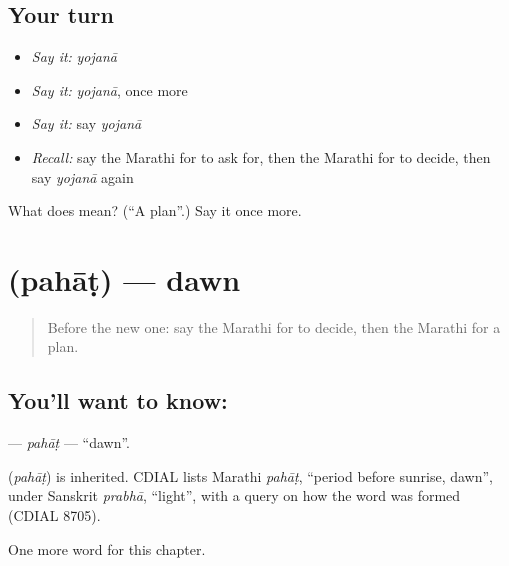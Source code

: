 \subsection*{Your turn}
\begin{itemize}
\raggedright
  \item \emph{Say it:} \emph{yojanā}
  \item \emph{Say it:} \emph{yojanā}, once more
  \item \emph{Say it:} say \emph{yojanā}
  \item \emph{Recall:} say the Marathi for to ask for, then the Marathi for to decide, then say \emph{yojanā} again
\end{itemize}

\begin{tcolorbox}[breakable,colback=teal!4,colframe=teal!35!black,title={Before you move on}]
What does  mean? (\textquotedblleft{}A plan\textquotedblright{}.) Say it once more.
\end{tcolorbox}
\section[\texorpdfstring{\mr{पहाट} (pahāṭ)}{पहाट (pahāṭ)}]{ (pahāṭ) — dawn}

\label{lesson:MR-C124-pahat}



\begin{quote}
Before the new one: say the Marathi for to decide, then the Marathi for a plan.
\end{quote}

\subsection*{You'll want to know: }
\textbf{} — \emph{pahāṭ} — \textquotedblleft{}dawn\textquotedblright{}.

\begin{cousinweb}
\textbf{} (\emph{pahāṭ}) is inherited. CDIAL lists Marathi \emph{pahāṭ}, \textquotedblleft{}period before sunrise, dawn\textquotedblright{}, under Sanskrit \emph{prabhā}, \textquotedblleft{}light\textquotedblright{}, with a query on how the word was formed (CDIAL 8705).
\end{cousinweb}

\begin{grammarlens}[title={What you've built}]
One more word for this chapter.
\end{grammarlens}

